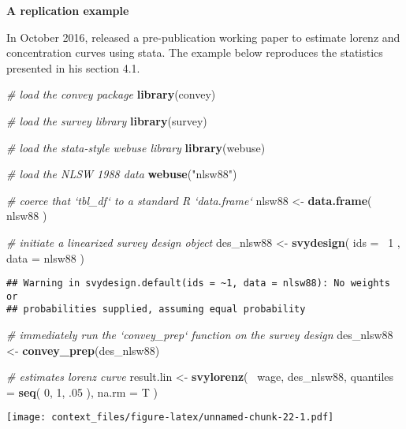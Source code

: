 \documentclass[]{book}
\newenvironment{Shaded}{\begin{snugshade}}{\end{snugshade}}
\newcommand{\KeywordTok}[1]{\textcolor[rgb]{0.13,0.29,0.53}{\textbf{{#1}}}}
\newcommand{\DataTypeTok}[1]{\textcolor[rgb]{0.13,0.29,0.53}{{#1}}}
\newcommand{\DecValTok}[1]{\textcolor[rgb]{0.00,0.00,0.81}{{#1}}}
\newcommand{\StringTok}[1]{\textcolor[rgb]{0.31,0.60,0.02}{{#1}}}
\newcommand{\CommentTok}[1]{\textcolor[rgb]{0.56,0.35,0.01}{\textit{{#1}}}}
\newcommand{\NormalTok}[1]{{#1}}
\begin{document}
\textbf{A replication example}

In October 2016, \citep{jann2016} released a pre-publication working
paper to estimate lorenz and concentration curves using stata. The
example below reproduces the statistics presented in his section 4.1.

\begin{Shaded}
\begin{Highlighting}[]
\CommentTok{# load the convey package}
\KeywordTok{library}\NormalTok{(convey)}

\CommentTok{# load the survey library}
\KeywordTok{library}\NormalTok{(survey)}

\CommentTok{# load the stata-style webuse library}
\KeywordTok{library}\NormalTok{(webuse)}

\CommentTok{# load the NLSW 1988 data}
\KeywordTok{webuse}\NormalTok{(}\StringTok{"nlsw88"}\NormalTok{)}

\CommentTok{# coerce that `tbl_df` to a standard R `data.frame`}
\NormalTok{nlsw88 <-}\StringTok{ }\KeywordTok{data.frame}\NormalTok{( nlsw88 )}

\CommentTok{# initiate a linearized survey design object}
\NormalTok{des_nlsw88 <-}\StringTok{ }\KeywordTok{svydesign}\NormalTok{( }\DataTypeTok{ids =} \NormalTok{~}\DecValTok{1} \NormalTok{, }\DataTypeTok{data =} \NormalTok{nlsw88 )}
\end{Highlighting}
\end{Shaded}

\begin{verbatim}
## Warning in svydesign.default(ids = ~1, data = nlsw88): No weights or
## probabilities supplied, assuming equal probability
\end{verbatim}

\begin{Shaded}
\begin{Highlighting}[]
\CommentTok{# immediately run the `convey_prep` function on the survey design}
\NormalTok{des_nlsw88 <-}\StringTok{ }\KeywordTok{convey_prep}\NormalTok{(des_nlsw88)}

\CommentTok{# estimates lorenz curve}
\NormalTok{result.lin <-}\StringTok{ }\KeywordTok{svylorenz}\NormalTok{( ~wage, des_nlsw88, }\DataTypeTok{quantiles =} \KeywordTok{seq}\NormalTok{( }\DecValTok{0}\NormalTok{, }\DecValTok{1}\NormalTok{, .}\DecValTok{05} \NormalTok{), }\DataTypeTok{na.rm =} \NormalTok{T )}
\end{Highlighting}
\end{Shaded}

\texttt{[image: context\_files/figure-latex/unnamed-chunk-22-1.pdf]}
\end{document}
